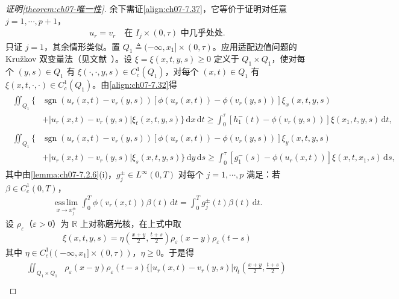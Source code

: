 \documentclass[../../main.tex]{subfiles}%
\begin{document}
\begin{proof}[证明\cref{theorem:ch07-唯一性}]
余下需证\eqref{align:ch07-7.37}，它等价于证明对任意 $j=1,\cdots,p+1$，
\begin{align}
u_r=v_r\quad\text{在 }I_j\times(0,\tau)\text{ 中几乎处处}. \label{align:ch07-7.38}
\end{align}
只证 $j=1$，其余情形类似。置 $Q_1\triangleq(-\infty,x_1]\times(0,\tau)$。应用适配边值问题的 Kružkov 双变量法（见文献~\cite{ref68,ref75,ref91}）。设 $\xi=\xi(x,t,y,s)\geqslant0$ 定义于 $Q_1\times Q_1$，使对每个 $(y,s)\in Q_1$ 有 $\xi(\cdot,\cdot,y,s)\in C^1_c(Q_1)$，对每个 $(x,t)\in Q_1$ 有 $\xi(x,t,\cdot,\cdot)\in C^1_c(Q_1)$。由\eqref{align:ch07-7.32}得
\begin{align*}
\begin{aligned}
\iint_{Q_1}\{&\operatorname{sgn}(u_r(x,t)-v_r(y,s))[\phi(u_r(x,t))-\phi(v_r(y,s))]\xi_x(x,t,y,s)\\
&+|u_r(x,t)-v_r(y,s)|\xi_t(x,t,y,s)\}\,\mathrm{d}x\,\mathrm{d}t
\geqslant\int_0^\tau[h_1^-(t)-\phi(v_r(y,s))]\xi(x_1,t,y,s)\,\mathrm{d}t,
\end{aligned}
\end{align*}
\begin{align*}
\begin{aligned}
\iint_{Q_1}\{&\operatorname{sgn}(u_r(x,t)-v_r(y,s))[\phi(u_r(x,t))-\phi(v_r(y,s))]\xi_y(x,t,y,s)\\
&+|u_r(x,t)-v_r(y,s)|\xi_s(x,t,y,s)\}\,\mathrm{d}y\,\mathrm{d}s
\geqslant\int_0^\tau[g_1^-(s)-\phi(u_r(x,t))]\xi(x,t,x_1,s)\,\mathrm{d}s,
\end{aligned}
\end{align*}
其中由\cref{lemma:ch07-7.2.6}(i)，$g_j^\pm\in L^\infty(0,T)$ 对每个 $j=1,\cdots,p$ 满足：若 $\beta\in C^1_c(0,T)$，
\begin{align}
\operatorname*{ess\,lim}_{x\to x_j^\pm}\int_0^T\phi(v_r(x,t))\beta(t)\,\mathrm{d}t
=\int_0^Tg_j^\pm(t)\beta(t)\,\mathrm{d}t. \label{align:ch07-7.39}
\end{align}
设 $\rho_\varepsilon$（$\varepsilon>0$）为 $\mathbb{R}$ 上对称磨光核，在上式中取
\begin{align}
\xi(x,t,y,s)=\eta\left(\frac{x+y}{2},\frac{t+s}{2}\right)\rho_\varepsilon(x-y)\rho_\varepsilon(t-s) \label{align:ch07-7.40}
\end{align}
其中 $\eta\in C^1_c((-\infty,x_1]\times(0,\tau))$，$\eta\geqslant0$。于是得
\begin{align}
\begin{aligned}
\iint_{Q_1\times Q_1}&\rho_\varepsilon(x-y)\rho_\varepsilon(t-s)\Big\{|u_r(x,t)-v_r(y,s)|\eta_t\left(\frac{x+y}{2},\frac{t+s}{2}\right)\\

\end{aligned}
\end{align}
\end{proof}
\end{document}

